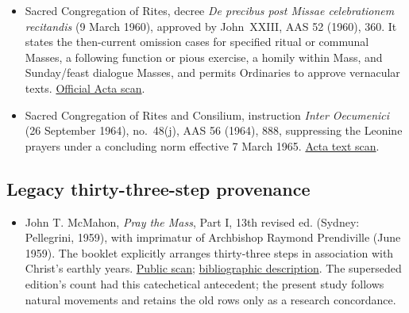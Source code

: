 \begin{itemize}
  \item Sacred Congregation of Rites, decree \emph{De precibus post Missae celebrationem recitandis} (9 March 1960), approved by John~XXIII, AAS 52 (1960), 360. It states the then-current omission cases for specified ritual or communal Masses, a following function or pious exercise, a homily within Mass, and Sunday/feast dialogue Masses, and permits Ordinaries to approve vernacular texts. \href{https://www.vatican.va/archive/aas/documents/AAS-52-1960-ocr.pdf}{Official Acta scan}.
  \item Sacred Congregation of Rites and Consilium, instruction \emph{Inter Oecumenici} (26 September 1964), no.~48(j), AAS 56 (1964), 888, suppressing the Leonine prayers under a concluding norm effective 7 March 1965. \href{https://liturgia.it/content/instructiones/inter%20oecumenici.pdf}{Acta text scan}.
\end{itemize}

\subsection{Legacy thirty-three-step provenance}

\begin{itemize}
  \item John T. McMahon, \emph{Pray the Mass}, Part I, 13th revised ed. (Sydney: Pellegrini, 1959), with imprimatur of Archbishop Raymond Prendiville (June 1959). The booklet explicitly arranges thirty-three steps in association with Christ's earthly years. \href{https://www.ccwatershed.org/pdfs/pray-mass-booklet/download/}{Public scan}; \href{https://www.ccwatershed.org/2014/09/13/pray-mass-booklet-and-cards/}{bibliographic description}. The superseded edition's count had this catechetical antecedent; the present study follows natural movements and retains the old rows only as a research concordance.
\end{itemize}

\endgroup
